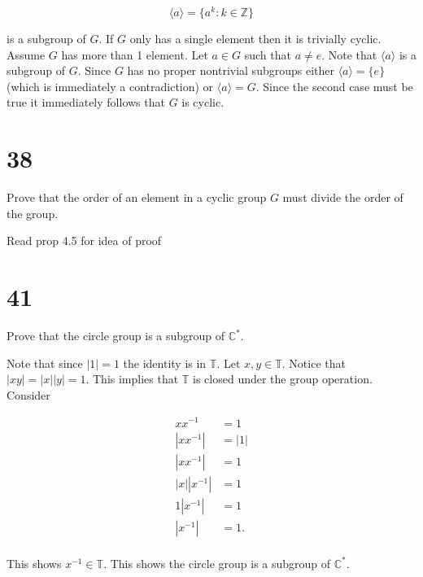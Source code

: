 \documentclass[a4paper]{article}
\begin{document}
$$\langle a \rangle = \{ a^k : k \in \mathbb{Z} \}$$

is a subgroup of $G$. If $G$ only has a single element then it is trivially cyclic. Assume $G$ has more than 1 element. Let $a \in G$ such that $a \neq e$. Note that $\langle a \rangle$ is a subgroup of $G$. Since $G$ has no proper nontrivial subgroups either $\langle a \rangle = \{ e \}$ (which is immediately a contradiction) or $\langle a \rangle = G$. Since the second case must be true it immediately follows that $G$ is cyclic.


\section*{38}

Prove that the order of an element in a cyclic group $G$ must divide the order of the group.

\vspace{\baselineskip}

Read prop 4.5 for idea of proof


\section*{41}

Prove that the circle group is a subgroup of $\mathbb{C}^*$.

\vspace{\baselineskip}

Note that since $|1| = 1$ the identity is in $\mathbb{T}$. Let $x,y \in \mathbb{T}$. Notice that $|xy| = |x||y| = 1$. This implies that $\mathbb{T}$ is closed under the group operation. Consider 

\begin{align*}
x x^{-1} &= 1 \\
|x x ^{-1}| &= |1| \\
|x x ^{-1}| &= 1 \\
|x| |x ^{-1}| &= 1 \\
1 | x ^{-1}| &= 1 \\
|x ^{-1}| &= 1 .\\
\end{align*}

This shows $x^{-1} \in \mathbb{T}$. This shows the circle group is a subgroup of $\mathbb{C}^*$.
\end{document}
